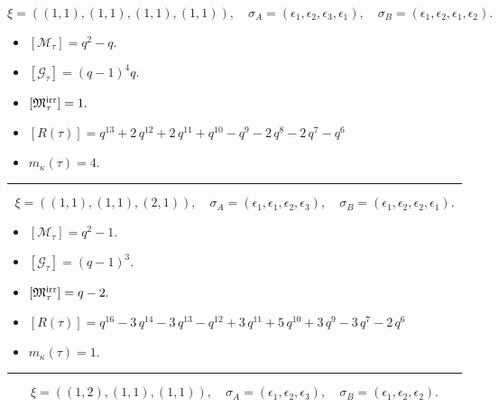 \documentclass[10pt,a4paper]{amsart}
\begin{document}
$$\xi = ({(1, 1), (1, 1), (1, 1)}, {(1, 1)}),\quad \sigma_A = ({{\epsilon_1}, {\epsilon_2}, {\epsilon_3}}, {{\epsilon_1}}),\quad \sigma_B = ({{\epsilon_1}, {\epsilon_2}, {\epsilon_1}}, {{\epsilon_2}}).$$

\begin{itemize}
 \item $[\mathcal{M}_{\tau}] = q^{2} - q .$

 \item $[\mathcal{G}_{\tau}] = {\left(q - 1\right)}^{4} q .$

 \item $[{\frak M}_{\tau}^{\textrm{irr}}] = 1 .$

 \item $[R(\tau)] = q^{13} + 2 \, q^{12} + 2 \, q^{11} + q^{10} - q^{9} - 2 \, q^{8} - 2 \, q^{7} - q^{6} $

 \item $m_{\kappa}(\tau) = 4 .$

 \end{itemize}
\noindent\rule{8cm}{0.4pt}

$$\xi = ({(1, 1), (1, 1)}, {(2, 1)}),\quad \sigma_A = ({{\epsilon_1}, {\epsilon_1}}, {{\epsilon_2, \epsilon_3}}),\quad \sigma_B = ({{\epsilon_1}, {\epsilon_2}}, {{\epsilon_2, \epsilon_1}}).$$

\begin{itemize}
 \item $[\mathcal{M}_{\tau}] = q^{2} - 1 .$

 \item $[\mathcal{G}_{\tau}] = {\left(q - 1\right)}^{3} .$

 \item $[{\frak M}_{\tau}^{\textrm{irr}}] = q - 2 .$

 \item $[R(\tau)] = q^{16} - 3 \, q^{14} - 3 \, q^{13} - q^{12} + 3 \, q^{11} + 5 \, q^{10} + 3 \, q^{9} - 3 \, q^{7} - 2 \, q^{6} $

 \item $m_{\kappa}(\tau) = 1 .$

 \end{itemize}
\noindent\rule{8cm}{0.4pt}

$$\xi = ({(1, 2)}, {(1, 1), (1, 1)}),\quad \sigma_A = ({{\epsilon_1}}, {{\epsilon_2}, {\epsilon_3}}),\quad \sigma_B = ({{\epsilon_1}}, {{\epsilon_2}, {\epsilon_2}}).$$
\end{document}
